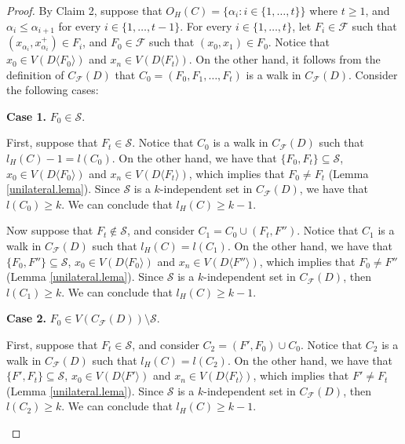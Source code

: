 \documentclass[10pt,a4paper]{article}
\begin{document}
\begin{proof}
By Claim 2, suppose that $O_{H}(C)=\{ \alpha_{i} : i \in \{1, \ldots , t \} \}$ where $t \geq 1$, and $\alpha_{i} \leq \alpha_{i+1}$ for every $i \in  \{ 1, \ldots , t-1 \}$. For every $i \in \{ 1, \ldots , t \}$, let $F_{i} \in \mathscr{F}$ such that $(x_{\alpha_{i}}, x_{\alpha_{i}}^{+} ) \in F_{i}$, and $F_{0} \in \mathscr{F}$ such that $(x_{0}, x_{1}) \in F_{0}$. 
Notice that $x_{0} \in V(D \langle F_{0} \rangle)$ and $x_{n} \in V(D \langle F_{t} \rangle )$. On the other hand, it follows from the definition of $C_{\mathscr{F}}(D)$ that $C_{0}=(F_{0}, F_{1}, \ldots , F_{t})$ is a walk in $C_{\mathscr{F}}(D)$.  Consider the following cases:

\begin{description}
	\item \textbf{Case 1.} $F_{0} \in \mathcal{S}$.
	
		First, suppose that $F_{t} \in \mathcal{S}$. Notice that $C_{0}$ is a walk in $C_{\mathscr{F}}(D)$ such that $l_{H}(C) - 1=l(C_{0})$. On the other hand, we have that $\{ F_{0}, F_{t} \} \subseteq \mathcal{S}$, $x_{0} \in V(D \langle F_{0} \rangle )$ and $x_{n} \in V(D\langle F_{t} \rangle )$, which implies that $F_{0} \neq F_{t}$ (Lemma \ref{unilateral.lema}). Since $\mathcal{S}$ is a $k$-independent set in $C_{\mathscr{F}}(D)$, we have that $l(C_{0}) \geq k$. We can conclude that $l_{H}(C) \geq k-1$. 	
		
		Now suppose that $F_{t} \notin \mathcal{S}$, and consider $C_{1}=C_{0} \cup (F_{t}, F'')$. Notice that $C_{1}$ is a walk in $C_{\mathscr{F}}(D)$ such that $l_{H}(C)=l(C_{1})$. On the other hand, we have that $\{ F_{0}, F'' \} \subseteq \mathcal{S}$, $x_{0} \in V(D \langle F_{0} \rangle )$ and $x_{n} \in V(D\langle F'' \rangle )$, which implies that $F_{0} \neq F''$ (Lemma \ref{unilateral.lema}).  Since $\mathcal{S}$ is a $k$-independent set in $C_{\mathscr{F}}(D)$, then $l(C_{1}) \geq k$. We can conclude that $l_{H}(C)\geq k-1$.
			
	\item \textbf{Case 2.} $F_{0} \in V(C_{\mathscr{F}}(D))\setminus \mathcal{S}$.
	
			First, suppose that $F_{t} \in \mathcal{S}$, and consider $C_{2}=(F', F_{0} ) \cup C_{0}$. Notice that $C_{2}$ is a walk in $C_{\mathscr{F}}(D)$ such that $l_{H}(C)=l(C_{2})$. On the other hand, we have that $\{ F', F_{t} \} \subseteq \mathcal{S}$, $x_{0} \in V(D \langle F' \rangle )$ and $x_{n} \in V(D\langle F_{t} \rangle )$, which implies that $F' \neq F_{t}$ (Lemma \ref{unilateral.lema}). Since $\mathcal{S}$ is a $k$-independent set in $C_{\mathscr{F}}(D)$, then $l(C_{2}) \geq k$. We can conclude that $l_{H}(C)\geq k-1$.
			

\end{description}
\end{proof}
\end{document}
